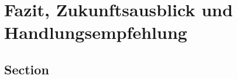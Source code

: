 
\chapter{Fazit, Zukunftsausblick und Handlungsempfehlung}
\label{fazit}
\section{Section}
\blindtext